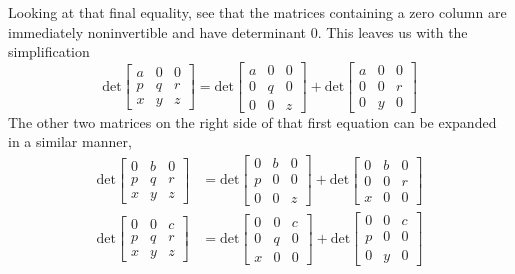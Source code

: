 \documentclass{report}
\begin{document}
Looking at that final equality, see that the matrices containing a zero column are immediately noninvertible and have determinant 0. This leaves us with the simplification
\begin{equation*}
\text{det}\left[\begin{array}{ccc}
a&0&0\\
p&q&r\\
x&y&z
\end{array}\right]=
\text{det}\left[\begin{array}{ccc}
a&0&0\\
0&q&0\\
0&0&z
\end{array}\right]+
\text{det}\left[\begin{array}{ccc}
a&0&0\\
0&0&r\\
0&y&0
\end{array}\right]
\end{equation*}
The other two matrices on the right side of that first equation can be expanded in a similar manner, 
\begin{align*}
\text{det}\left[\begin{array}{ccc}
0&b&0\\
p&q&r\\
x&y&z
\end{array}\right]&=
\text{det}\left[\begin{array}{ccc}
0&b&0\\
p&0&0\\
0&0&z
\end{array}\right]+
\text{det}\left[\begin{array}{ccc}
0&b&0\\
0&0&r\\
x&0&0
\end{array}\right]\\
\text{det}\left[\begin{array}{ccc}
0&0&c\\
p&q&r\\
x&y&z
\end{array}\right]&=
\text{det}\left[\begin{array}{ccc}
0&0&c\\
0&q&0\\
x&0&0
\end{array}\right]+
\text{det}\left[\begin{array}{ccc}
0&0&c\\
p&0&0\\
0&y&0
\end{array}\right]
\end{align*}
\end{document}
